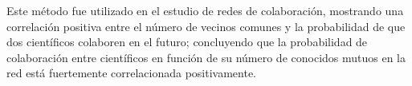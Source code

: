Este método fue utilizado  \cite{newman2001clustering}  en el estudio de redes de colaboración, mostrando una correlación positiva entre el número de vecinos comunes y la probabilidad de que dos científicos colaboren en el futuro; concluyendo que la probabilidad de colaboración entre científicos  en función de su número de conocidos mutuos en la red está fuertemente correlacionada positivamente.